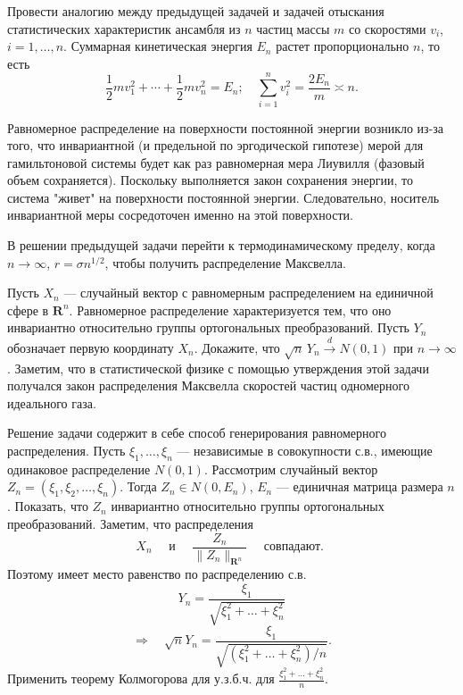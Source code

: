 \begin{problem}
Провести аналогию между предыдущей задачей и задачей отыскания статистических характеристик ансамбля из $n$ частиц массы $m$  со скоростями $v_i$, $i=1,\dots,n$. Суммарная кинетическая энергия $E_n$ растет пропорционально $n$, то есть 
\begin{equation*}
\frac{1}{2}mv_1^2+\cdots+\frac{1}{2}m v_n^2 = E_n;\quad \sum_{i=1}^n v^2_i=\frac{2E_n}{m}\asymp n.
\end{equation*}
\end{problem}
\begin{remark}
Равномерное распределение на поверхности постоянной энергии возникло из-за того, что инвариантной (и предельной по эргодической гипотезе) мерой для гамильтоновой системы будет как раз равномерная мера Лиувилля (фазовый объем сохраняется). Поскольку выполняется закон сохранения энергии, то система "живет"  на поверхности постоянной энергии. Следовательно, носитель инвариантной меры сосредоточен именно на этой поверхности. 

В решении предыдущей задачи перейти к термодинамическому пределу, когда $n\to\infty$, $r = \sigma n^{1/2}$, чтобы получить распределение Максвелла. 
\end{remark}

\begin{problem}
Пусть $X_n$ --- случайный вектор с равномерным распределением на единичной сфере в ${\mathbf R}^n$. Равномерное распределение 
характеризуется тем, что оно инвариантно относительно группы ортогональных преобразований. Пусть $Y_n$ обозначает первую координату $X_n$. 
Докажите, что $\sqrt{n}\, Y_n \xrightarrow{d}N(0,1)$ при $n\to\infty$. Заметим, что в статистической физике с помощью утверждения 
этой задачи получался закон распределения Максвелла скоростей частиц одномерного идеального газа. 
\end{problem}

\begin{remark}
Решение задачи содержит в себе способ генерирования равномерного распределения. 
Пусть $\xi_1,\ldots, \xi_n$ --- независимые в совокупности с.в., имеющие одинаковое распределение $N(0,1)$. Рассмотрим случайный вектор 
$Z_n=(\xi_1,\xi_2,\ldots,\xi_n)$. Тогда $Z_n\in N(0,E_n)$, $E_n$ --- единичная матрица размера $n$. Показать, что $Z_n$ инвариантно относительно группы ортогональных преобразований. Заметим, что распределения 
$$
X_n \quad\text{ и } \quad \frac{Z_n}{\|Z_n \|_{{\mathbf R}^n}} \quad \text{ совпадают. }
$$
Поэтому имеет место равенство по распределению с.в. 
$$
Y_n=\frac{\xi_1}{\sqrt{\xi_1^2+\ldots+ \xi_n^2}} 
$$
$$
\Rightarrow \quad \sqrt{n}Y_n = \frac{\xi_1}{\sqrt{(\xi_1^2+\ldots+ \xi_n^2)/n}} . 
$$
Применить теорему Колмогорова для у.з.б.ч. для $\frac{\xi_1^2+\ldots+ \xi_n^2}{n}$. 

\end{remark}

